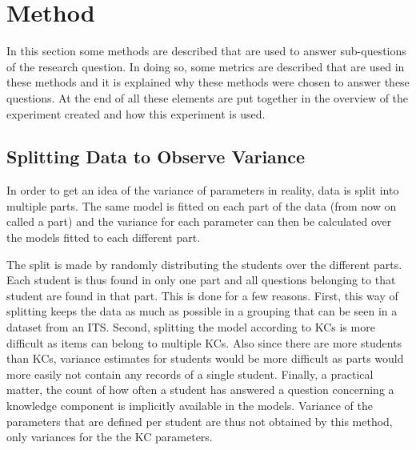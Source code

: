 \documentclass{scrartcl}
\begin{document}
\section{Method}

In this section some methods are described that are used to answer sub-questions of the research question. In doing so, some metrics are described that are used in these methods and it is explained why these methods were chosen to answer these questions. At the end of all these elements are put together in the overview of the experiment created and how this experiment is used.

\subsection{Splitting Data to Observe Variance}
\label{sec:splits}
In order to get an idea of the variance of parameters in reality, data is split into multiple parts. The same model is fitted on each part of the data (from now on called a part) and the variance for each parameter can then be calculated over the models fitted to each different part. 

The split is made by randomly distributing the students over the different parts. Each student is thus found in only one part and all questions belonging to that student are found in that part. This is done for a few reasons. First, this way of splitting keeps the data as much as possible in a grouping that can be seen in a dataset from an ITS.  Second, splitting the model according to KCs is more difficult as items can belong to multiple KCs. Also since there are more students than KCs, variance estimates for students would be more difficult as parts would more easily not contain any records of a single student. Finally, a practical matter, the count of how often a student has answered a question concerning a knowledge component is implicitly available in the models. Variance of the parameters that are defined per student are thus not obtained by this method, only variances for the the KC parameters.
\end{document}
